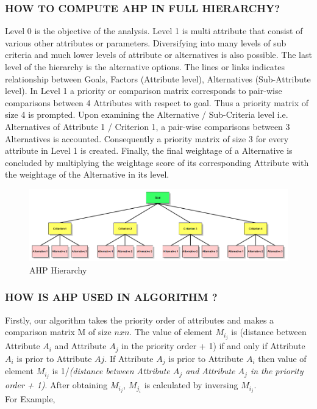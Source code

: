 \documentclass[12pt,oneside]{book}
\begin{document}
\subsubsection{HOW TO COMPUTE AHP IN FULL HIERARCHY?}
Level 0 is the objective of the analysis. Level 1 is multi attribute that consist of various other attributes or parameters. Diversifying into many levels of sub criteria and much lower levels of attribute or alternatives is also possible. The last level of the hierarchy is the alternative options. The lines or links indicates relationship between Goals, Factors (Attribute level), Alternatives (Sub-Attribute level). In Level 1 a priority or comparison matrix corresponds to pair-wise comparisons between 4 Attributes with respect to goal. Thus a priority matrix of size 4 is prompted. Upon examining  the Alternative / Sub-Criteria level i.e.  Alternatives of Attribute 1 / Criterion 1, a  pair-wise comparisons between 3 Alternatives is accounted. Consequently a priority matrix of size 3 for every attribute in Level 1 is created. Finally, the final weightage of a Alternative is concluded by multiplying the weightage score of its corresponding Attribute with the weightage of the Alternative in its level.\\
\begin{figure}[h]
    \centering
    \includegraphics[width=1.05\textwidth]{AHP}
    \caption{AHP Hierarchy}
    \label{fig:AHP}
\end{figure}
\subsubsection{HOW IS AHP USED IN ALGORITHM ?}
Firstly, our algorithm takes the priority order of attributes and makes a comparison matrix M of size $n x n$. The value of element $M_i_j$ is (distance between Attribute $A_i$ and Attribute $A_j$ in the priority order + 1) if  and only if Attribute $A_i$ is prior to Attribute $Aj$. If Attribute $A_j$ is prior to Attribute $A_i$ then value of element $M_i_j$ is 1/\textit{(distance between Attribute $A_j$ and Attribute $A_j$ in the priority order + 1)}. After obtaining $M_i_j$, $M_j_i$ is calculated by inversing $M_i_j$.\\
For Example,
\end{document}

